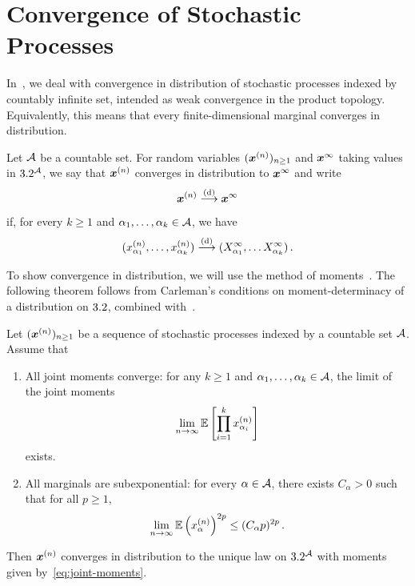 \section{Convergence of Stochastic Processes}
\label{sec:convergence-process}

In~, we deal
with convergence in distribution of
stochastic processes indexed by countably
infinite set, intended as weak convergence in the
product topology. Equivalently, this
means that every finite-dimensional
marginal converges in distribution.

\begin{definition}
    Let ${\cal A}$ be a countable
    set. For random variables $({\bm x}^{(n)})_{n\ge 1}$ and
    ${\bm x}^\infty$ taking values in $3.2^{\cal A}$, we say
    that ${\bm x}^{(n)}$ converges in distribution to
    ${\bm x}^\infty$ and write
    \[
        {\bm x}^{(n)}\overset{\textnormal{(d)}}{\longrightarrow} {\bm x}^\infty
    \]
    if, for every $k\ge 1$ and $\alpha_1, \ldots,\alpha_k\in {\cal A}$, we have
    \[
        (x^{(n)}_{\alpha_1},\ldots,x^{(n)}_{\alpha_k})\overset{\textnormal{(d)}}{\longrightarrow} (X^\infty_{\alpha_1},\ldots X^{\infty}_{\alpha_k})\,.
    \]
\end{definition}

\noindent To show convergence in distribution, we will use the method of moments~\cite[Theorems 29.4, 30.1, 30.2]{billingsleyProbabilityBook}.
The following theorem follows from
Carleman's conditions on 
moment-determinacy of a distribution on
$3.2$, combined with~\cite{petersenEquivalence}.

\begin{theorem}\label{cor:bounded-limit-existence}
    Let $({\bm x}^{(n)})_{n\ge 1}$ be a sequence
    of stochastic processes indexed by a
    countable set ${\cal A}$. Assume
    that 
    \begin{enumerate}
        \item All joint moments converge: for any
        $k\ge 1$ and $\alpha_1, \ldots, \alpha_k\in {\cal A}$,
        the limit of the joint moments
    \begin{align}
        \lim_{n\to\infty} \operatorname*{\mathbb{E}} \left[\prod_{i=1}^k x^{(n)}_{\alpha_i}\right]\label{eq:joint-moments}
    \end{align} 
    exists.
        \item All marginals are subexponential: for every $\alpha\in{\cal A}$, there exists $C_\alpha>0$ such that
        for all $p\ge 1$,
        \begin{align}
            \lim_{n\to\infty} \operatorname*{\mathbb{E}} \left(x^{(n)}_\alpha\right)^{2p}\le (C_\alpha p)^{2p}\,.\label{eq:subexp-growth-condition}
        \end{align}
    \end{enumerate}
    Then ${\bm x}^{(n)}$ converges in distribution to the unique law on $3.2^{\cal A}$ with
    moments given by~\cref{eq:joint-moments}.
\end{theorem}



